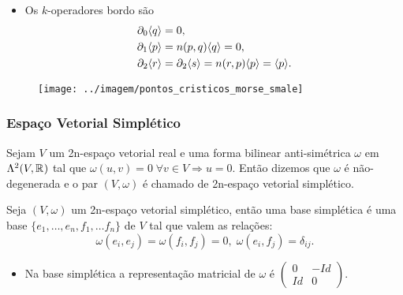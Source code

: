 \documentclass{beamer}
\begin{document}
\begin{footnotesize}
\begin{frame}
\begin{minipage}[t]{0.5\linewidth}
\begin{itemize}
				\item Os $k$-operadores bordo são
				$$
				\begin{aligned}
				\partial_{0}\langle q\rangle &=0, 
				\\
				\partial_{1}\langle p\rangle &=n(p,q)\langle q\rangle = 0,
				\\
				\partial_{2}\langle r\rangle&=\partial_{2}\langle s\rangle = n(r,p)\langle p\rangle = \langle p\rangle.
				\end{aligned}
				$$
				
			\end{itemize}
		\end{minipage}
		\hfill%
		\begin{minipage}[t]{0.4\linewidth}
			\begin{figure}
				\centering
				\textbf{}\par
				\texttt{[image: ../imagem/pontos\_cristicos\_morse\_smale]}
			\end{figure}
			
		\end{minipage}
		
	\end{frame}
	

	\begin{frame}
		\frametitle{Espaço Vetorial Simplético}
		\begin{definicao}
			Sejam $V$ um 2n-espaço vetorial real e uma forma bilinear anti-simétrica $\omega$ em $\Lambda^{2}(V, \mathbb{R}^{})$ tal que $\omega(u,v) = 0 \; \forall v \in V \Rightarrow u=0$. Então dizemos que $\omega$ é não-degenerada e o par $(V, \omega)$ é chamado de 2n-espaço vetorial simplético.
		\end{definicao}
	
		\begin{definicao}
			Seja $(V, \omega)$ um 2n-espaço vetorial simplético, então uma base simplética é uma base $\{ e_{1},\dots, e_{n},f_{1},\dots f_{n}\}$ de $V$ tal que valem as relações:
			$$
			\omega(e_{i}, e_{j}) = \omega(f_{i}, f_{j}) = 0, \; \omega(e_{i}, f_{j}) = \delta_{ij}.
			$$
		\end{definicao}
		\begin{itemize}
			\item 	Na base simplética a representação matricial de $\omega$ é $\left(
			\begin{array}{cc}
			0 & -Id
			\\
			Id & 0
			\end{array}
			\right) $.
		\end{itemize}
		

\end{frame}
\end{footnotesize}
\end{document}
